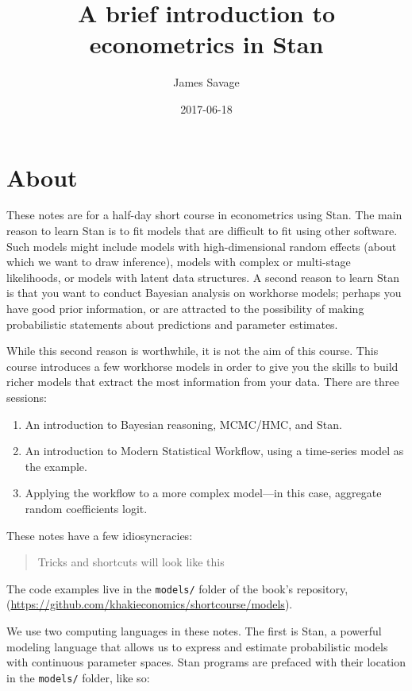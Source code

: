 \documentclass[]{book}
\title{A brief introduction to econometrics in Stan}
\author{James Savage}
\date{2017-06-18}
\providecommand{\tightlist}{%
  \setlength{\itemsep}{0pt}\setlength{\parskip}{0pt}}
\begin{document}
\maketitle

{
\setcounter{tocdepth}{1}
\tableofcontents
}
\chapter*{About}\label{about}

These notes are for a half-day short course in econometrics using Stan.
The main reason to learn Stan is to fit models that are difficult to fit
using other software. Such models might include models with
high-dimensional random effects (about which we want to draw inference),
models with complex or multi-stage likelihoods, or models with latent
data structures. A second reason to learn Stan is that you want to
conduct Bayesian analysis on workhorse models; perhaps you have good
prior information, or are attracted to the possibility of making
probabilistic statements about predictions and parameter estimates.

While this second reason is worthwhile, it is not the aim of this
course. This course introduces a few workhorse models in order to give
you the skills to build richer models that extract the most information
from your data. There are three sessions:

\begin{enumerate}
\def\labelenumi{\arabic{enumi}.}
\tightlist
\item
  An introduction to Bayesian reasoning, MCMC/HMC, and Stan.
\item
  An introduction to Modern Statistical Workflow, using a time-series
  model as the example.
\item
  Applying the workflow to a more complex model---in this case,
  aggregate random coefficients logit.
\end{enumerate}

These notes have a few idiosyncracies:

\begin{quote}
Tricks and shortcuts will look like this
\end{quote}

The code examples live in the \texttt{models/} folder of the book's
repository,
(\url{https://github.com/khakieconomics/shortcourse/models}).

We use two computing languages in these notes. The first is Stan, a
powerful modeling language that allows us to express and estimate
probabilistic models with continuous parameter spaces. Stan programs are
prefaced with their location in the \texttt{models/} folder, like so:
\end{document}
